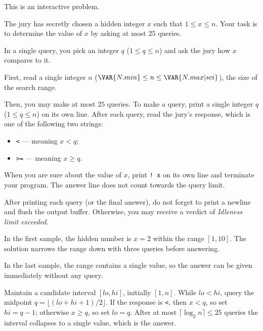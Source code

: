 This is an interactive problem.

The jury has secretly chosen a hidden integer $x$ such that $1 \le x \le n$.
Your task is to determine the value of $x$ by asking at most $25$ queries.

In a single query, you pick an integer $q$ ($1 \le q \le n$) and ask the jury how
$x$ compares to it.

First, read a single integer $n$ ($\VAR{N.min} \le n \le \VAR{N.max | sci}$),
the size of the search range.

Then, you may make at most $25$ queries. To make a query, print a single
integer $q$ ($1 \le q \le n$) on its own line. After each query, read the jury's
response, which is one of the following two strings:

\begin{itemize}
	\item \texttt{<} --- meaning $x < q$;
	\item \texttt{>=} --- meaning $x \ge q$.
\end{itemize}

When you are sure about the value of $x$, print \texttt{! x} on its own line and
terminate your program. The answer line does not count towards the query limit.

After printing each query (or the final answer), do not forget to print a newline
and flush the output buffer. Otherwise, you may receive a verdict of
\textit{Idleness limit exceeded}.

In the first sample, the hidden number is $x = 2$ within the range $[1, 10]$.
The solution narrows the range down with three queries before answering.

In the last sample, the range contains a single value, so the answer can be
given immediately without any query.

Maintain a candidate interval $[lo, hi]$, initially $[1, n]$. While $lo < hi$,
query the midpoint $q = \lfloor (lo + hi + 1) / 2 \rfloor$. If the response is
\texttt{<}, then $x < q$, so set $hi = q - 1$; otherwise $x \ge q$, so set
$lo = q$. After at most $\lceil \log_2 n \rceil \le 25$ queries the interval
collapses to a single value, which is the answer.
